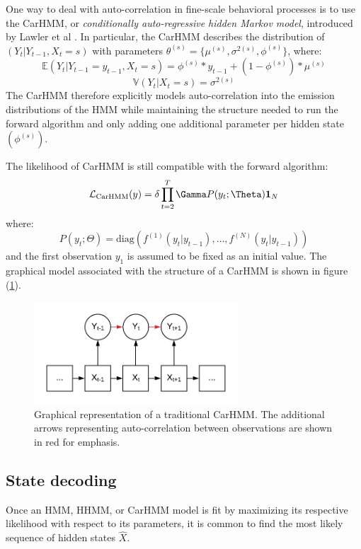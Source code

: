 One way to deal with auto-correlation in fine-scale behavioral processes is to use the CarHMM, or \textit{conditionally auto-regressive hidden Markov model}, introduced by Lawler et al \cite{Lawler:2019}. In particular, the CarHMM describes the distribution of $(Y_t|Y_{t-1}, X_t=s)$ with parameters $\theta^{(s)} = \{\mu^{(s)},\sigma^{2(s)},\phi^{(s)}\}$, where:
%
$$\mathbb{E}(Y_t|Y_{t-1} = y_{t-1},X_t=s) = \phi^{(s)}*y_{t-1} + (1-\phi^{(s)}) * \mu^{(s)}$$
$$\mathbb{V}(Y_t| X_t = s) = \sigma^{2(s)}$$
%
The CarHMM therefore explicitly models auto-correlation into the emission distributions of the HMM while maintaining the structure needed to run the forward algorithm and only adding one additional parameter per hidden state $(\phi^{(s)})$. 

The likelihood of CarHMM is still compatible with the forward algorithm:
\begin{equation}
\calL_{\text{CarHMM}}(y) = \delta \prod_{t=2}^T \Gamma P(y_t;\Theta) \mathbf{1}_N
\label{CarHMM_likelihood}
\end{equation}
where:
%
$$P(y_t;\Theta) = \text{diag}\left(f^{(1)}(y_t|y_{t-1}), \ldots , f^{(N)}(y_t|y_{t-1}) \right)$$
%
and the first observation $y_1$ is assumed to be fixed as an initial value. The graphical model associated with the structure of a CarHMM is shown in figure (\ref{fig:CarHMM}).

\begin{figure}[h!]
	\centering
	\includegraphics[width=3in]{../Plots/CarHMM.png}
	\caption{Graphical representation of a traditional CarHMM. The additional arrows representing auto-correlation between observations are shown in red for emphasis.}
	\label{fig:CarHMM}
\end{figure}


\subsection{State decoding}

Once an HMM, HHMM, or CarHMM model is fit by maximizing its respective likelihood with respect to its parameters, it is common to find the most likely sequence of hidden states $\hat X$. 

